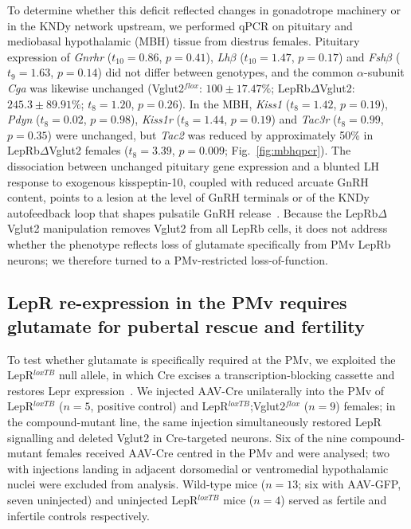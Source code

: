 \documentclass[11pt]{article}
\begin{document}
To determine whether this deficit reflected changes in gonadotrope machinery or in the KNDy network upstream, we performed qPCR on pituitary and mediobasal hypothalamic (MBH) tissue from diestrus females. Pituitary expression of \textit{Gnrhr} ($t_{10}=0.86$, $p=0.41$), \textit{Lh$\beta$} ($t_{10}=1.47$, $p=0.17$) and \textit{Fsh$\beta$} ($t_{9}=1.63$, $p=0.14$) did not differ between genotypes, and the common $\alpha$-subunit \textit{Cga} was likewise unchanged (Vglut2$^{flox}$: $100\pm17.47\%$; LepRb$\Delta$Vglut2: $245.3\pm89.91\%$; $t_{8}=1.20$, $p=0.26$). In the MBH, \textit{Kiss1} ($t_{8}=1.42$, $p=0.19$), \textit{Pdyn} ($t_{8}=0.02$, $p=0.98$), \textit{Kiss1r} ($t_{8}=1.44$, $p=0.19$) and \textit{Tac3r} ($t_{8}=0.99$, $p=0.35$) were unchanged, but \textit{Tac2} was reduced by approximately 50\% in LepRb$\Delta$Vglut2 females ($t_{8}=3.39$, $p=0.009$; Fig.~\ref{fig:mbhqpcr}). The dissociation between unchanged pituitary gene expression and a blunted LH response to exogenous kisspeptin-10, coupled with reduced arcuate GnRH content, points to a lesion at the level of GnRH terminals or of the KNDy autofeedback loop that shapes pulsatile GnRH release~\citep{navarro2011regulation,navarro2013interactions}. Because the LepRb$\Delta$Vglut2 manipulation removes Vglut2 from all LepRb cells, it does not address whether the phenotype reflects loss of glutamate specifically from PMv LepRb neurons; we therefore turned to a PMv-restricted loss-of-function.

\subsection{LepR re-expression in the PMv requires glutamate for pubertal rescue and fertility}
To test whether glutamate is specifically required at the PMv, we exploited the LepR$^{loxTB}$ null allele, in which Cre excises a transcription-blocking cassette and restores Lepr expression~\citep{berglund2012direct}. We injected AAV-Cre unilaterally into the PMv of LepR$^{loxTB}$ ($n=5$, positive control) and LepR$^{loxTB}$;Vglut2$^{flox}$ ($n=9$) females; in the compound-mutant line, the same injection simultaneously restored LepR signalling and deleted Vglut2 in Cre-targeted neurons. Six of the nine compound-mutant females received AAV-Cre centred in the PMv and were analysed; two with injections landing in adjacent dorsomedial or ventromedial hypothalamic nuclei were excluded from analysis. Wild-type mice ($n=13$; six with AAV-GFP, seven uninjected) and uninjected LepR$^{loxTB}$ mice ($n=4$) served as fertile and infertile controls respectively.
\end{document}
